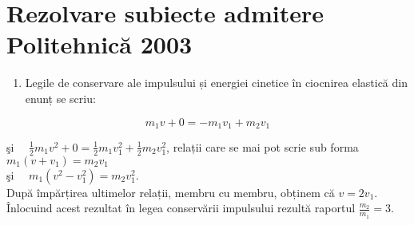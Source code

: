 \section*{Rezolvare subiecte admitere Politehnică 2003}
\begin{enumerate}
  \item Legile de conservare ale impulsului și energiei cinetice în ciocnirea elastică din enunț se scriu:
\end{enumerate}

$$
m_{1} v+0=-m_{1} v_{1}+m_{2} v_{1}
$$

şi $\quad \frac{1}{2} m_{1} v^{2}+0=\frac{1}{2} m_{1} v_{1}^{2}+\frac{1}{2} m_{2} v_{1}^{2}$, relații care se mai pot scrie sub forma\\
$m_{1}\left(v+v_{1}\right)=m_{2} v_{1}$\\
şi $\quad m_{1}\left(v^{2}-v_{1}^{2}\right)=m_{2} v_{1}^{2}$.\\
După împărțirea ultimelor relații, membru cu membru, obținem că $v=2 v_{1}$. Înlocuind acest rezultat în legea conservării impulsului rezultă raportul $\frac{m_{2}}{m_{1}}=3$.

